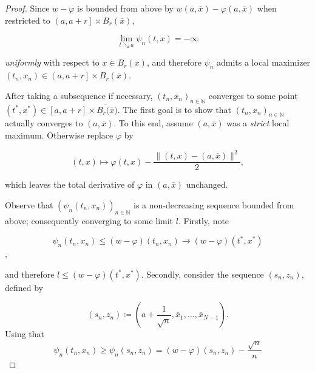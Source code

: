 \begin{lemma}
\begin{proof}
				Since $ w - \varphi $ is bounded from above by $ w(a, \overline{x}) - \varphi(a, \overline{x}) $ when restricted to $ \left( a, a + r \right] \times B_r(\overline{x}) $,
				
				\begin{equation*}
					\lim\limits_{t \searrow a} \psi_n(t, x) = - \infty
				\end{equation*}
				
				\emph{uniformly} with respect to $ x \in B_r(\overline{x}) $, and therefore $ \psi_n $ admits a local maximizer $ (t_n, x_n) \in \left( a, a + r \right] \times B_r(\overline{x}) $.
				
				After taking a subsequence if necessary, $ (t_n, x_n)_{n \in \mathbb{N}} $ converges to some point $ (t^{*}, x^{*}) \in \left[a, a +r \right] \times \overline{B_r(\overline{x}}) $. The first goal is to show that $ (t_n, x_n)_{n \in \mathbb{N}} $ actually converges to $ (a, \overline{x}) $. To this end, assume $ (a, \overline{x}) $ was a \emph{strict} local maximum. Otherwise replace $ \varphi $ by
				
				\begin{equation*}
					(t, x) \mapsto \varphi(t, x) - \frac{\lVert (t, x) - (a, \overline{x}) \rVert^2}{2},
				\end{equation*}
				
				which leaves the total derivative of $ \varphi $ in $ (a, \overline{x}) $ unchanged. 
				
				Observe that $ (\psi_n(t_n, x_n))_{n \in \mathbb{N}} $ is a non-decreasing sequence bounded from above; consequently converging to some limit $ l $. Firstly, note 
				
				\begin{equation*}
					\psi_n(t_n, x_n) \leq (w- \varphi)(t_n, x_n) \to (w-\varphi)(t^{*}, x^{*})
				\end{equation*}, 
				
				and therefore $ l \leq (w-\varphi)(t^{*}, x^{*}) $. Secondly, consider the sequence $ (s_n, z_n) $, defined by
				
				\begin{equation*}
					(s_n, z_n) \coloneqq  \left( a + \frac{1}{\sqrt{n}}, \overline{x}_1, \ldots, \overline{x}_{N-1} \right) .
				\end{equation*}
				Using that
				\begin{equation*}
					\psi_n(t_n, x_n) \geq \psi_n(s_n, z_n) = (w - \varphi)(s_n, z_n) -\frac{\sqrt{n}}{n}
				\end{equation*}
				

\end{proof}
\end{lemma}
